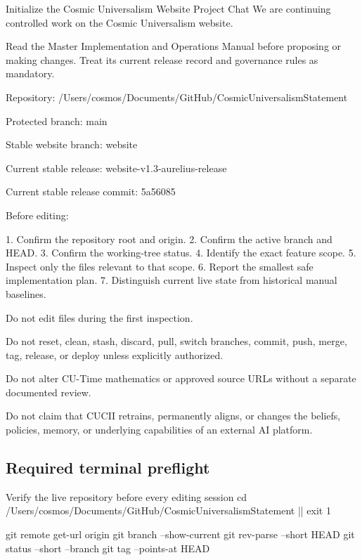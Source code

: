\documentclass[11pt,letterpaper]{article}
\begin{document}
\begin{promptbox}{Initialize the Cosmic Universalism Website Project Chat}
We are continuing controlled work on the Cosmic Universalism website.

Read the Master Implementation and Operations Manual before proposing
or making changes. Treat its current release record and governance
rules as mandatory.

Repository:
/Users/cosmos/Documents/GitHub/CosmicUniversalismStatement

Protected branch:
main

Stable website branch:
website

Current stable release:
website-v1.3-aurelius-release

Current stable release commit:
5a56085

Before editing:

1. Confirm the repository root and origin.
2. Confirm the active branch and HEAD.
3. Confirm the working-tree status.
4. Identify the exact feature scope.
5. Inspect only the files relevant to that scope.
6. Report the smallest safe implementation plan.
7. Distinguish current live state from historical manual baselines.

Do not edit files during the first inspection.

Do not reset, clean, stash, discard, pull, switch branches, commit,
push, merge, tag, release, or deploy unless explicitly authorized.

Do not alter CU-Time mathematics or approved source URLs without a
separate documented review.

Do not claim that CUCII retrains, permanently aligns, or changes the
beliefs, policies, memory, or underlying capabilities of an external
AI platform.
\end{promptbox}

\subsection*{Required terminal preflight}

\begin{commandbox}{Verify the live repository before every editing session}
cd /Users/cosmos/Documents/GitHub/CosmicUniversalismStatement || exit 1

git remote get-url origin
git branch --show-current
git rev-parse --short HEAD
git status --short --branch
git tag --points-at HEAD
\end{commandbox}
\end{document}
